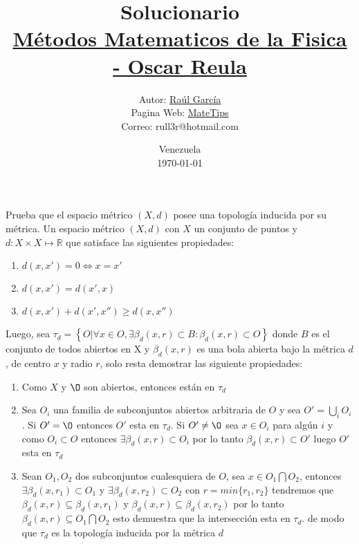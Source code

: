 \documentclass[10pt,a4paper]{jhwhw}
\author{Autor: \href{https://www.facebook.com/ruller}{Raúl García}\\Pagina Web: \href{https://rull3r.github.io/}{MateTips}\\Correo: rull3r@hotmail.com}
\date{Venezuela\\ \today \\}
\title{Solucionario \\\href{https://books.google.co.ve/books?id=i4aToAEACAAJ}{Métodos Matematicos de la Fisica - Oscar Reula}\\}
\begin{document}
	
	\problema{ }\label{pro:2}
	Prueba que el espacio métrico $(X,d)$ posee una topología inducida por su métrica.
	\solution 
	Un espacio métrico $(X,d)$ con $X$ un conjunto de puntos y $d:X\times X \longmapsto \mathbb{R}$ que satisface las siguientes propiedades:
	\begin{enumerate}[\hspace{1cm}(i)]
		\item $d(x,x')=0\Leftrightarrow x=x'$
		\item $d(x,x')=d(x',x)$
		\item $d(x,x')+d(x',x'')\geq d(x,x'')$
	\end{enumerate}

	Luego, sea $\tau_d=\left\lbrace O | \forall x \in O, \exists \beta_d(x,r)\subset B \colon \beta_d(x,r)\subset O \right\rbrace $  donde $B$ es el conjunto de todos abiertos en X y $\beta_d(x,r)$ es una bola abierta bajo la métrica $d$, de centro $x$ y radio $r$, solo resta demostrar las siguiente propiedades:
	
	\begin{enumerate}[\hspace{1cm}(i)]
		\item Como $X$ y $\O$ son abiertos, entonces están en $\tau_d$
		\item Sea $O_i$ una familia de subconjuntos abiertos arbitraria de $O$ y sea $O'=\bigcup_iO_i$. Si $O'=\O$ entonces $O'$ esta en $\tau_d$. Si $O'\neq\O$ sea $x\in O_i$ para algún $i$ y como $O_i\subset O$ entonces $\exists\beta_d(x,r)\subset O_i$ por lo tanto $\beta_d(x,r)\subset O'$ luego $O'$ esta en $\tau_d$
		
		\item Sean $O_1, O_2$ dos subconjuntos cualesquiera de $O$, sea $x\in O_1\bigcap O_2$, entonces $\exists\beta_d(x,r_1)\subset O_1$ y $\exists\beta_d(x,r_2)\subset O_2$ con $r=min \{r_1,r_2\}$ tendremos que $\beta_d(x,r)\subseteq \beta_d(x,r_1)$ y $\beta_d(x,r)\subseteq \beta_d(x,r_2)$ por lo tanto $\beta_d(x,r)\subseteq O_1\bigcap O_2$ esto demuestra que la intersección esta en $\tau_d$. de modo que $\tau_d$ es la topología inducida por la métrica $d$ \QEPD
	\end{enumerate}
\end{document}
